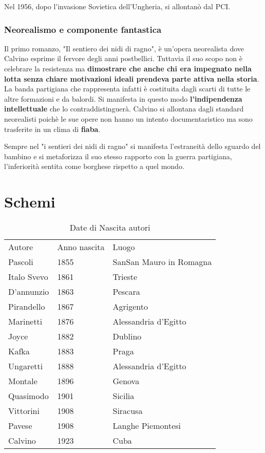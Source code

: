 \documentclass[10pt]{report}
\begin{document}
			Nel 1956, dopo l'invasione Sovietica dell'Ungheria, si allontanò dal PCI.
			
			\subsection{Neorealismo e componente fantastica}
			Il primo romanzo, "Il sentiero dei nidi di ragno", è un'opera neorealista dove Calvino esprime il fervore degli anni postbellici.
			Tuttavia il suo scopo non è celebrare la resistenza ma \textbf{dimostrare che anche chi era impegnato nella lotta senza chiare motivazioni ideali prendeva parte attiva nella storia}. La banda partigiana che rappresenta infatti è costituita dagli scarti di tutte le altre formazioni e da balordi. 
			Si manifesta in questo modo \textbf{l'indipendenza intellettuale} che lo contraddistinguerà.
			Calvino si allontana dagli standard neorealisti poichè le sue opere non hanno un intento documentaristico ma sono trasferite in un clima di \textbf{fiaba}.
			
			Sempre nel "i sentieri dei nidi di ragno" si manifesta l'estraneità dello sguardo del bambino e si metaforizza il suo stesso rapporto con la guerra partigiana, l'inferiorità sentita come borghese rispetto a quel mondo.
					
			\chapter*{Schemi}
			
			
					
						\begin{table}[]
				\centering
				\caption{Date di Nascita autori}
				\label{Date di Nascita autori}
				\begin{tabular}{lll}
					Autore      & Anno nascita & Luogo                   \\
					Pascoli     & 1855         & SanSan Mauro in Romagna \\
					Italo Svevo & 1861         & Trieste                 \\
					D'annunzio  & 1863         & Pescara                 \\
					Pirandello  & 1867         & Agrigento               \\
					Marinetti   & 1876         & Alessandria d'Egitto    \\
					Joyce       & 1882         & Dublino                 \\
					Kafka       & 1883         & Praga                   \\
					Ungaretti   & 1888         & Alessandria d'Egitto    \\
					Montale     & 1896         & Genova                  \\
					Quasimodo   & 1901         & Sicilia                 \\
					Vittorini   & 1908         & Siracusa                \\
					Pavese      & 1908         & Langhe Piemontesi       \\
					Calvino     & 1923         & Cuba                   
				\end{tabular}
			\end{table}
			
			
	
	

	
	
	
	
	
	
	
	
\end{document}
